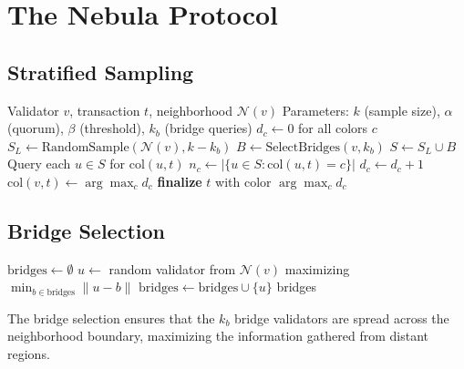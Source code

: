 \section{The Nebula Protocol}

\label{sec:protocol}

\subsection{Stratified Sampling}

\begin{algorithm}[H]
\caption{Nebula Protocol --- Stratified Neighborhood Sampling}
\label{alg:nebula-core}
\begin{algorithmic}[1]
\Require Validator $v$, transaction $t$, neighborhood $\mathcal{N}(v)$
\Require Parameters: $k$ (sample size), $\alpha$ (quorum), $\beta$ (threshold), $k_b$ (bridge queries)
\State $d_c \gets 0$ for all colors $c$
    \State {}
    \State $S_L \gets \text{RandomSample}(\mathcal{N}(v), k - k_b)$
    \State {}
    \State $B \gets \text{SelectBridges}(v, k_b)$ 
    \State $S \gets S_L \cup B$ 
    \State Query each $u \in S$ for $\text{col}(u, t)$
        \State $n_c \gets |\{u \in S : \text{col}(u, t) = c\}|$
            \State $d_c \gets d_c + 1$
        \EndIf
    \EndFor
    \State $\text{col}(v, t) \gets \arg\max_c d_c$
        \State \textbf{finalize} $t$ with color $\arg\max_c d_c$
    \EndIf
\EndWhile
\end{algorithmic}
\end{algorithm}

\subsection{Bridge Selection}

\begin{algorithm}[H]
\caption{Nebula Bridge Selection}
\label{alg:nebula-bridge}
\begin{algorithmic}[1]
    \State $\text{bridges} \gets \emptyset$
    \State {}
        \State $u \gets$ random validator from $\mathcal{N}(v)$ maximizing $\min_{b \in \text{bridges}} \|u - b\|$
        \State $\text{bridges} \gets \text{bridges} \cup \{u\}$
    \EndFor
    \State \Return bridges
\EndFunction
\end{algorithmic}
\end{algorithm}

The bridge selection ensures that the $k_b$ bridge validators are spread across
the neighborhood boundary, maximizing the information gathered from distant regions.

